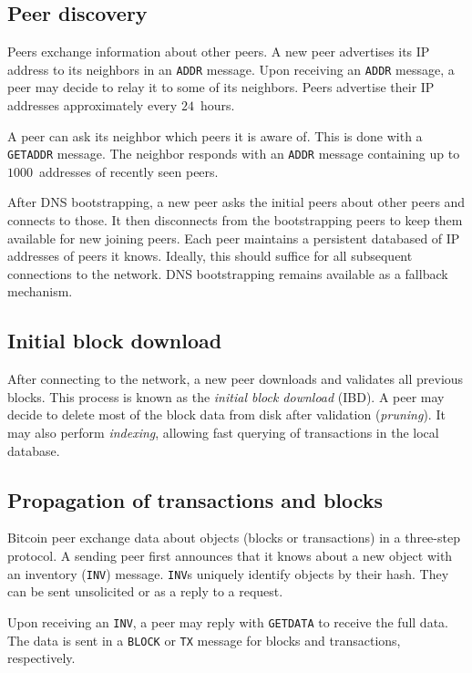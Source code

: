 \subsection{Peer discovery}

Peers exchange information about other peers.
A new peer advertises its IP address to its neighbors in an \texttt{ADDR} message.
Upon receiving an \texttt{ADDR} message, a peer may decide to relay it to some of its neighbors.
Peers advertise their IP addresses approximately every $24$~hours.

A peer can ask its neighbor which peers it is aware of.
This is done with a \texttt{GETADDR} message.
The neighbor responds with an \texttt{ADDR} message containing up to $1000$~addresses of recently seen peers.

After DNS bootstrapping, a new peer asks the initial peers about other peers and connects to those.
It then disconnects from the bootstrapping peers to keep them available for new joining peers.
Each peer maintains a persistent databased of IP addresses of peers it knows.
Ideally, this should suffice for all subsequent connections to the network.
DNS bootstrapping remains available as a fallback mechanism.

\subsection{Initial block download}

After connecting to the network, a new peer downloads and validates all previous blocks.
This process is known as the \textit{initial block download} (IBD).
A peer may decide to delete most of the block data from disk after validation (\textit{pruning}).
It may also perform \textit{indexing}, allowing fast querying of transactions in the local database.


\subsection{Propagation of transactions and blocks}

Bitcoin peer exchange data about objects (blocks or transactions) in a three-step protocol.
A sending peer first announces that it knows about a new object with an inventory (\texttt{INV}) message.
\texttt{INV}s uniquely identify objects by their hash.
They can be sent unsolicited or as a reply to a request.

Upon receiving an \texttt{INV}, a peer may reply with \texttt{GETDATA} to receive the full data.
The data is sent in a \texttt{BLOCK} or \texttt{TX} message for blocks and transactions, respectively.

